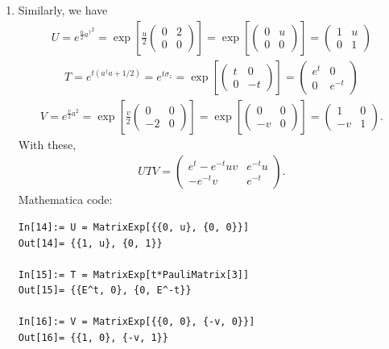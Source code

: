 \documentclass{article}
\theoremstyle{definition}
\newcommand{\f}[2]{\frac{#1}{#2}}
\newcommand{\lp}{\left(}
\newcommand{\rp}{\right)}
\newcommand{\lb}{\left[}
\newcommand{\rb}{\right]}
\begin{document}
\begin{enumerate}[label=(\alph*)]
\item Similarly, we have
\begin{align*}
U = e^{\f{u}{2} {a^\dagger}^2} = \exp\lb \f{u}{2} \begin{pmatrix}  
0 & 2 \\ 0 & 0 
\end{pmatrix} \rb = 
\exp\lb \begin{pmatrix}  
0 & u \\ 0 & 0 
\end{pmatrix} \rb 
= \begin{pmatrix}
1 & u \\ 0 & 1
\end{pmatrix}
\end{align*}
\begin{align*}
T = e^{t\lp a^\dagger a + 1/2 \rp} = e^{t\sigma_z} = \exp\lb \begin{pmatrix} t & 0 \\ 0 & -t  \end{pmatrix} \rb
= \begin{pmatrix}
e^t & 0 \\ 0 & e^{-t}
\end{pmatrix}
\end{align*}
\begin{align*}
V = e^{\f{v}{2}a^2} = \exp\lb \f{v}{2}\begin{pmatrix}  0 & 0 \\ -2 & 0   \end{pmatrix} \rb
= \exp\lb \begin{pmatrix}  0 & 0 \\ -v & 0  \end{pmatrix} \rb = \begin{pmatrix}
1 & 0 \\ -v & 1
\end{pmatrix}.
\end{align*}
With these,
\begin{align*}
UTV = 
\begin{pmatrix}
e^t - e^{-t} uv & e^{-t} u    \\ -e^{-t} v & e^{-t}
\end{pmatrix}.
\end{align*}
Mathematica code:
\begin{lstlisting}
In[14]:= U = MatrixExp[{{0, u}, {0, 0}}]
Out[14]= {{1, u}, {0, 1}}

In[15]:= T = MatrixExp[t*PauliMatrix[3]]
Out[15]= {{E^t, 0}, {0, E^-t}}

In[16]:= V = MatrixExp[{{0, 0}, {-v, 0}}]
Out[16]= {{1, 0}, {-v, 1}}


\end{lstlisting}
\end{enumerate}
\end{document}
